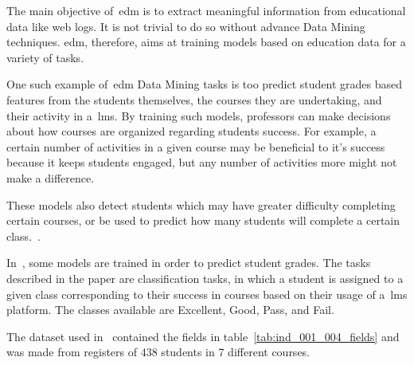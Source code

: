 The main objective of~\gls{edm} is to extract meaningful information from
educational data like web logs. It is not trivial to do so without advance Data
Mining techniques. \gls{edm}, therefore, aims at training models based on
education data for a variety of tasks.

One such example of~\gls{edm} Data Mining tasks is too predict student grades
based features from the students themselves, the courses they are undertaking,
and their activity in a~\gls{lms}. By training such models, professors can make
decisions about how courses are organized regarding students success. For
example, a certain number of activities in a given course may be beneficial to
it's success because it keeps students engaged, but any number of activities
more might not make a difference.~\cite{ind_001, ind_002, ind_005}

These models also detect students which may have greater difficulty completing
certain courses, or be used to predict how many students will complete a
certain class.~\cite{ind_007, ind_008}.

In~\cite{ind_001}, some models are trained in order to predict student grades.
The tasks described in the paper are classification tasks, in which a student
is assigned to a given class corresponding to their success in courses based on
their usage of a~\gls{lms} platform. The classes available are Excellent, Good,
Pass, and Fail.

The dataset used in~\cite{ind_001} contained the fields in
table~\ref{tab:ind_001_004_fields} and was made from registers of 438 students
in 7 different courses.

